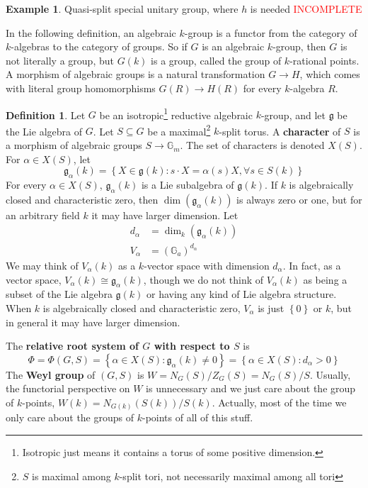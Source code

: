 \documentclass[12pt]{article}
\theoremstyle{definition}
\newtheorem{definition}{Definition}
\newtheorem{example}{Example}
\newcommand{\G}{\mathbb{G}}
\newcommand{\lb}{\left\{}
\newcommand{\rb}{\right\}}
\newcommand{\tbf}{\textbf}
\newcommand{\noi}{\noindent}
\newcommand{\incomplete}{\textcolor{red}{INCOMPLETE}}
\newcommand{\iso}{\cong}
\newcommand{\frakg}{\mathfrak{g}}
\begin{document}
\begin{example}
Quasi-split special unitary group, where $h$ is needed \incomplete
\end{example}

\noi In the following definition, an algebraic $k$-group is a functor from the category of $k$-algebras to the category of groups. So if $G$ is an algebraic $k$-group, then $G$ is not literally a group, but $G(k)$ is a group, called the group of $k$-rational points. A morphism of algebraic groups is a natural transformation $G \to H$, which comes with literal group homomorphisms $G(R) \to H(R)$ for every $k$-algebra $R$.

\begin{definition}
\label{isotropic group}
Let $G$ be an isotropic\footnote{Isotropic just means it contains a torus of some positive dimension.} reductive algebraic $k$-group, and let $\frakg$ be the Lie algebra of $G$. Let $S \subseteq G$ be a maximal\footnote{$S$ is maximal among $k$-split tori, not necessarily maximal among all tori} $k$-split torus. A \tbf{character} of $S$ is a morphism of algebraic groups $S \to \G_m$. The set of characters is denoted $X(S)$. For $\alpha \in X(S)$, let
\[
	\frakg_\alpha(k) = \lb X \in \frakg(k) : s \cdot X = \alpha(s) X, \forall s \in S(k) \rb
\]
For every $\alpha \in X(S)$, $\frakg_\alpha(k)$ is a Lie subalgebra of $\frakg(k)$. If $k$ is algebraically closed and characteristic zero, then $\dim(\frakg_\alpha(k))$ is always zero or one, but for an arbitrary field $k$ it may have larger dimension. Let
\begin{align*}
	d_\alpha &= \dim_k(\frakg_\alpha(k)) \\
	V_\alpha &= (\G_a)^{d_\alpha}
\end{align*}
We may think of $V_\alpha(k)$ as a $k$-vector space with dimension $d_\alpha$. In fact, as a vector space, $V_\alpha(k) \iso \frakg_\alpha(k)$, though we do not think of $V_\alpha(k)$ as being a subset of the Lie algebra $\frakg(k)$ or having any kind of Lie algebra structure. When $k$ is algebraically closed and characteristic zero, $V_\alpha$ is just $\lb 0 \rb$ or $k$, but in general it may have larger dimension. 

 The \tbf{relative root system of $G$ with respect to $S$} is
\[
	\Phi = \Phi(G,S) = \lb \alpha \in X(S) : \frakg_\alpha(k) \neq 0 \rb = \lb \alpha \in X(S) : d_\alpha > 0 \rb
\]
The \tbf{Weyl group} of $(G,S)$ is $W = N_G(S) / Z_G(S) = N_G(S) / S$. Usually, the functorial perspective on $W$ is unnecessary and we just care about the group of $k$-points, $W(k) = N_{G(k)} (S(k)) / S(k)$. Actually, most of the time we only care about the groups of $k$-points of all of this stuff.
\end{definition}
\end{document}
